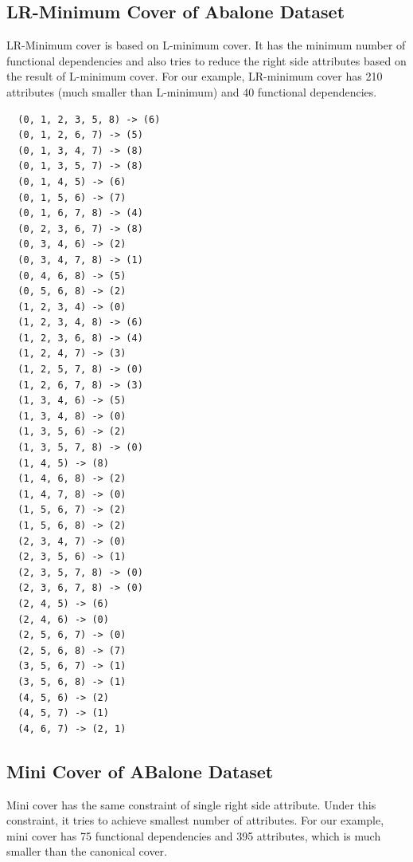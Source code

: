 \documentclass[11pt]{book}
\begin{document}
\subsection{LR-Minimum Cover of Abalone Dataset}

LR-Minimum cover is based on L-minimum cover. It has the minimum number of functional dependencies and also tries to reduce the right side attributes based on the result of L-minimum cover. For our example, LR-minimum cover has 210 attributes (much smaller than L-minimum) and 40 functional dependencies.

\begin{verbatim}
  (0, 1, 2, 3, 5, 8) -> (6)
  (0, 1, 2, 6, 7) -> (5)
  (0, 1, 3, 4, 7) -> (8)
  (0, 1, 3, 5, 7) -> (8)
  (0, 1, 4, 5) -> (6)
  (0, 1, 5, 6) -> (7)
  (0, 1, 6, 7, 8) -> (4)
  (0, 2, 3, 6, 7) -> (8)
  (0, 3, 4, 6) -> (2)
  (0, 3, 4, 7, 8) -> (1)
  (0, 4, 6, 8) -> (5)
  (0, 5, 6, 8) -> (2)
  (1, 2, 3, 4) -> (0)
  (1, 2, 3, 4, 8) -> (6)
  (1, 2, 3, 6, 8) -> (4)
  (1, 2, 4, 7) -> (3)
  (1, 2, 5, 7, 8) -> (0)
  (1, 2, 6, 7, 8) -> (3)
  (1, 3, 4, 6) -> (5)
  (1, 3, 4, 8) -> (0)
  (1, 3, 5, 6) -> (2)
  (1, 3, 5, 7, 8) -> (0)
  (1, 4, 5) -> (8)
  (1, 4, 6, 8) -> (2)
  (1, 4, 7, 8) -> (0)
  (1, 5, 6, 7) -> (2)
  (1, 5, 6, 8) -> (2)
  (2, 3, 4, 7) -> (0)
  (2, 3, 5, 6) -> (1)
  (2, 3, 5, 7, 8) -> (0)
  (2, 3, 6, 7, 8) -> (0)
  (2, 4, 5) -> (6)
  (2, 4, 6) -> (0)
  (2, 5, 6, 7) -> (0)
  (2, 5, 6, 8) -> (7)
  (3, 5, 6, 7) -> (1)
  (3, 5, 6, 8) -> (1)
  (4, 5, 6) -> (2)
  (4, 5, 7) -> (1)
  (4, 6, 7) -> (2, 1)
\end{verbatim}

\subsection{Mini Cover of ABalone Dataset}

Mini cover has the same constraint of single right side attribute. Under this constraint, it tries to achieve smallest number of attributes. For our example, mini cover has 75 functional dependencies and 395 attributes, which is much smaller than the canonical cover.
\end{document}
